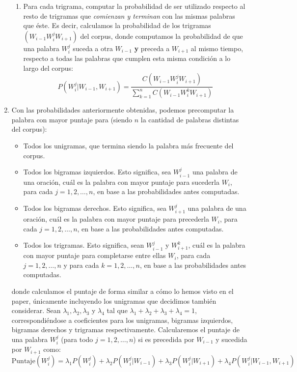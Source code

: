 \documentclass[a4paper]{article}
\begin{document}
\begin{enumerate}
\begin{enumerate}
        \item Para cada trigrama, computar la probabilidad de ser utilizado respecto al resto de trigramas que \textit{comienzan y terminan} con las mismas palabras que éste. Es decir, calculamos la probabilidad de los trigramas $(W_{i-1} W_i^j W_{i+1})$ del corpus, donde computamos la probabilidad de que una palabra $W_i^j$ suceda a otra $W_{i-1}$ \textbf{y} preceda a $W_{i+1}$ al mismo tiempo, respecto a todas las palabras que cumplen esta misma condición a lo largo del corpus:
            \[
                P(W_i^j|W_{i-1},W_{i+1}) = \frac{C(W_{i-1} W_i^j W_{i+1})}{\sum_{k=1}^n C(W_{i-1} W_i^k W_{i+1})}
            \]
        \end{enumerate}

    \item Con las probabilidades anteriormente obtenidas, podemos precomputar la palabra con mayor puntaje para (siendo $n$ la cantidad de palabras distintas del corpus):
        \begin{itemize}
            \item Todos los unigramas, que termina siendo la palabra más frecuente del corpus.
            \item Todos los bigramas izquierdos. Esto significa, sea $W_{i-1}^j$ una palabra de una oración, cuál es la palabra con mayor puntaje para sucederla $W_i$, para cada $j = 1,2,\dots,n$, en base a las probabilidades antes computadas.
            \item Todos los bigramas derechos. Esto significa, sea $W_{i+1}^j$ una palabra de una oración, cuál es la palabra con mayor puntaje para precederla $W_i$, para cada $j = 1,2,\dots,n$, en base a las probabilidades antes computadas.
            \item Todos los trigramas. Esto significa, sean $W_{i-1}^j$ y $W_{i+1}^k$, cuál es la palabra con mayor puntaje para completarse entre ellas $W_i$, para cada $j = 1,2,\dots,n$ y para cada $k =1,2,\dots,n$, en base a las probabilidades antes computadas.
        \end{itemize}

        donde calculamos el puntaje de forma similar a cómo lo hemos visto en el paper, únicamente incluyendo los unigramas que decidimos también considerar. Sean $\lambda_1, \lambda_2, \lambda_3$ y $\lambda_4$ tal que $\lambda_1 + \lambda_2 + \lambda_3 + \lambda_4 = 1$, correspondiéndose a coeficientes para los unigramas, bigramas izquierdos, bigramas derechos y trigramas respectivamente. Calcularemos el puntaje de una palabra $W_i^j$ (para todo $j=1,2,\dots,n$) si es precedida por $W_{i-1}$ y sucedida por $W_{i+1}$ como:
        \[
            \text{Puntaje}(W_i^j) = \lambda_1 P(W^j_i) + \lambda_2 P(W^j_i|W_{i-1}) + \lambda_3 P(W^j_i|W_{i+1}) + \lambda_4 P(W^j_i|W_{i-1},W_{i+1})
        \]


\end{enumerate}
\end{document}
